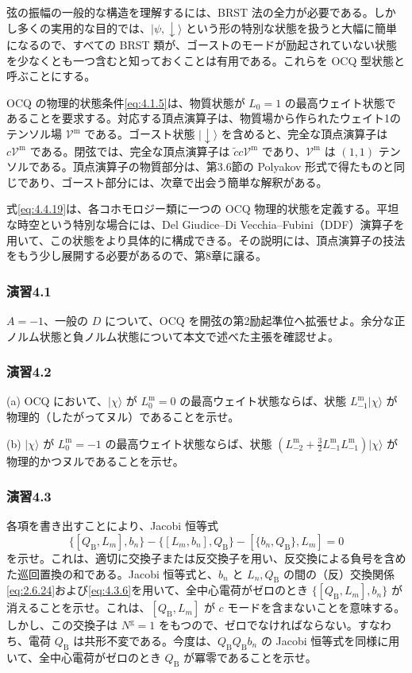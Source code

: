 弦の振幅の一般的な構造を理解するには、BRST 法の全力が必要である。しかし多くの実用的な目的では、$|\psi,\downarrow\rangle$ という形の特別な状態を扱うと大幅に簡単になるので、すべての BRST 類が、ゴーストのモードが励起されていない状態を少なくとも一つ含むと知っておくことは有用である。これらを OCQ 型状態と呼ぶことにする。

OCQ の物理的状態条件\eqref{eq:4.1.5}は、物質状態が $L_0=1$ の最高ウェイト状態であることを要求する。対応する頂点演算子は、物質場から作られたウェイト1のテンソル場 $\mathcal V^{\mathrm m}$ である。ゴースト状態 $|\downarrow\rangle$ を含めると、完全な頂点演算子は $c\mathcal V^{\mathrm m}$ である。閉弦では、完全な頂点演算子は $\widetilde c c\mathcal V^{\mathrm m}$ であり、$\mathcal V^{\mathrm m}$ は $(1,1)$ テンソルである。頂点演算子の物質部分は、第3.6節の Polyakov 形式で得たものと同じであり、ゴースト部分には、次章で出会う簡単な解釈がある。

式\eqref{eq:4.4.19}は、各コホモロジー類に一つの OCQ 物理的状態を定義する。平坦な時空という特別な場合には、Del Giudice--Di Vecchia--Fubini（DDF）演算子を用いて、この状態をより具体的に構成できる。その説明には、頂点演算子の技法をもう少し展開する必要があるので、第8章に譲る。


\subsubsection*{演習4.1}\label{ex:4.1}
$A=-1$、一般の $D$ について、OCQ を開弦の第2励起準位へ拡張せよ。余分な正ノルム状態と負ノルム状態について本文で述べた主張を確認せよ。

\subsubsection*{演習4.2}\label{ex:4.2}
(a) OCQ において、$|\chi\rangle$ が $L^{\mathrm m}_0=0$ の最高ウェイト状態ならば、状態 $L^{\mathrm m}_{-1}|\chi\rangle$ が物理的（したがってヌル）であることを示せ。

(b) $|\chi\rangle$ が $L^{\mathrm m}_0=-1$ の最高ウェイト状態ならば、状態
$(L^{\mathrm m}_{-2}+\tfrac32L^{\mathrm m}_{-1}L^{\mathrm m}_{-1})|\chi\rangle$
が物理的かつヌルであることを示せ。

\subsubsection*{演習4.3}\label{ex:4.3}
各項を書き出すことにより、Jacobi 恒等式
\[
\{[Q_{\mathrm B},L_m],b_n\}
-\{[L_m,b_n],Q_{\mathrm B}\}
-[\{b_n,Q_{\mathrm B}\},L_m]=0
\]
を示せ。これは、適切に交換子または反交換子を用い、反交換による負号を含めた巡回置換の和である。Jacobi 恒等式と、$b_n$ と $L_n,Q_{\mathrm B}$ の間の（反）交換関係\eqref{eq:2.6.24}および\eqref{eq:4.3.6}を用いて、全中心電荷がゼロのとき $\{[Q_{\mathrm B},L_m],b_n\}$ が消えることを示せ。これは、$[Q_{\mathrm B},L_m]$ が $c$ モードを含まないことを意味する。しかし、この交換子は $N^{\mathrm g}=1$ をもつので、ゼロでなければならない。すなわち、電荷 $Q_{\mathrm B}$ は共形不変である。今度は、$Q_{\mathrm B}Q_{\mathrm B}b_n$ の Jacobi 恒等式を同様に用いて、全中心電荷がゼロのとき $Q_{\mathrm B}$ が冪零であることを示せ。

